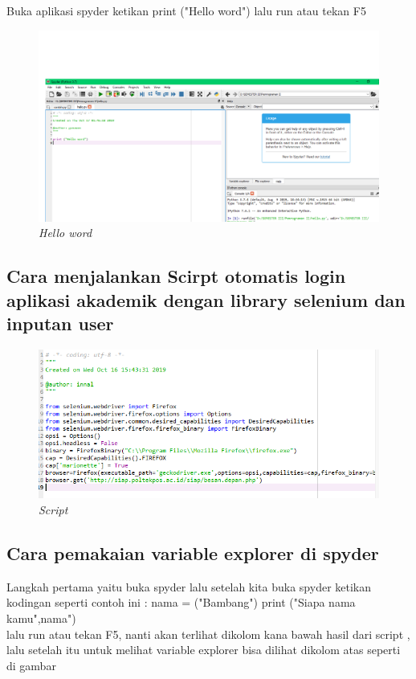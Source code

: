 \par Buka aplikasi spyder ketikan print ("Hello word") lalu run atau tekan F5

\begin{figure}[!htbp]
    \centering
    \includegraphics[scale=0.3]{gambar/hello.png}
    \caption{\textit{Hello word}}
    \label{Figure1}
\end{figure}

\subsection{Cara menjalankan Scirpt otomatis login aplikasi akademik dengan library selenium dan inputan user }

\begin{figure}[!htbp]
    \centering
    \includegraphics[scale=0.3]{gambar/code.png}
    \caption{\textit{Script}}
    \label{Figure1}
\end{figure}

\subsection{Cara pemakaian variable explorer di spyder}

\par Langkah pertama yaitu buka spyder lalu setelah kita buka spyder ketikan kodingan seperti contoh ini : nama = ("Bambang") print ("Siapa nama kamu",nama") \\
lalu run atau tekan F5, nanti akan terlihat dikolom kana bawah hasil dari script , lalu setelah itu untuk melihat variable explorer bisa dilihat dikolom atas seperti di gambar 

